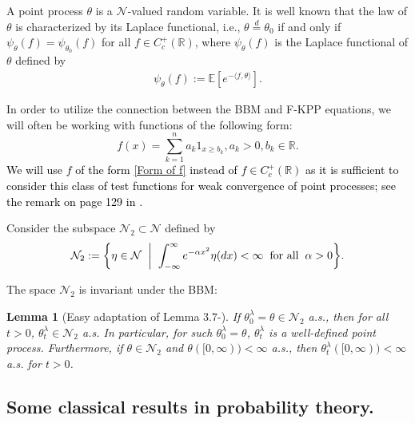 \documentclass[a4paper,reqno]{amsart}%
\newcommand{\1}{\mathbf 1}
\theoremstyle{mine}
\numberwithin{theorem}{section}
\newtheorem{lemma}[theorem]{Lemma}
\numberwithin{equation}{section}
\theoremstyle{remark}
\begin{document}
A point process $\theta$ is a $\mathcal{N}$-valued random variable. It is well known that the law of $\theta$ is characterized by its Laplace functional, i.e., $\theta \stackrel{d}{=} \theta_0$ if and only if $\psi_\theta(f)=\psi_{\theta_0}(f)$ for all $f \in C_c^+(\mathbb R)$, where $\psi_\theta(f)$ is the Laplace functional of $\theta$ defined by 
\begin{align*}
\psi_\theta(f):=\mathbb E[e^{-\langle f, \theta \rangle}].
\end{align*}

In order to utilize the connection between the BBM and F-KPP equations, we will often be working with functions of the following form:
\begin{equation} \label{Form of f}
f(x)= \sum_{k=1}^n a_k 1_{x \ge b_k}, a_k>0, b_k \in \mathbb R.
\end{equation}
\textcolor{black}{We will use $f$ of the form \eqref{Form of f} instead of $f \in C_c^+(\mathbb R)$ as it is sufficient to consider this class of test functions for weak convergence of point processes; see the remark on page 129 in \cite{Bovier_book}.}

Consider the subspace $\mathcal{N}_2 \subset \mathcal{N}$ defined by 
\begin{equation}\label{N_2-def}
     \mathcal{N}_2 := \biggl\{ \eta \in \mathcal{N}\hspace{2mm} \biggl|\hspace{2mm} \int_{-\infty}^{\infty} e^{-\alpha x^2} \eta(dx) <\infty \hspace{2mm} \textrm{for all} \hspace{2mm} \alpha >0\biggr\}.
 \end{equation}


The space $\mathcal N_2$ is invariant under the BBM:


\begin{lemma} [Easy adaptation of Lemma $3.7$-\cite{Shekhar_Domain}]\label{Proposition M_2}
If $\theta_0^\lambda = \theta \in \mathcal N_2$ a.s., then for all $t>0$, $\theta_t^\lambda \in \mathcal N_2$ a.s. In particular, for such $\theta_0^\lambda = \theta$, $\theta_t^\lambda$ is a well-defined point process. Furthermore, if $\theta \in \mathcal{N}_2$ and $\theta([0,\infty)) <\infty$ a.s., then $\theta_t^\lambda([0,\infty)) <\infty$ a.s. for $t>0$. 
\end{lemma}


\subsection{Some classical results in probability theory.}
\end{document}
